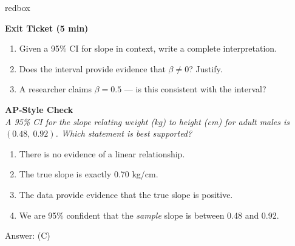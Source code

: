 \documentclass[10pt]{article}
\begin{document}
\begin{skillbox}{redbox}
\begin{minipage}[t]{0.48\linewidth}
    \textbf{Exit Ticket (5 min)}
    \begin{enumerate}
        \item Given a 95\% CI for slope in context, write a complete interpretation.
        \item Does the interval provide evidence that $\beta \ne 0$? Justify.
        \item A researcher claims $\beta = 0.5$ --- is this consistent with the interval?
    \end{enumerate}
\end{minipage}
\hfill
\begin{minipage}[t]{0.48\linewidth}
    \textbf{AP-Style Check}\\
    \textit{A 95\% CI for the slope relating weight (kg) to height (cm) for adult males is
    $(0.48,\ 0.92)$. Which statement is best supported?}
    \begin{enumerate}[label=(\Alph*)]
        \item There is no evidence of a linear relationship.
        \item The true slope is exactly 0.70 kg/cm.
        \item The data provide evidence that the true slope is positive.
        \item We are 95\% confident that the \emph{sample} slope is between 0.48 and 0.92.
    \end{enumerate}
    Answer: (C)
\end{minipage}
\end{skillbox}
\end{document}
